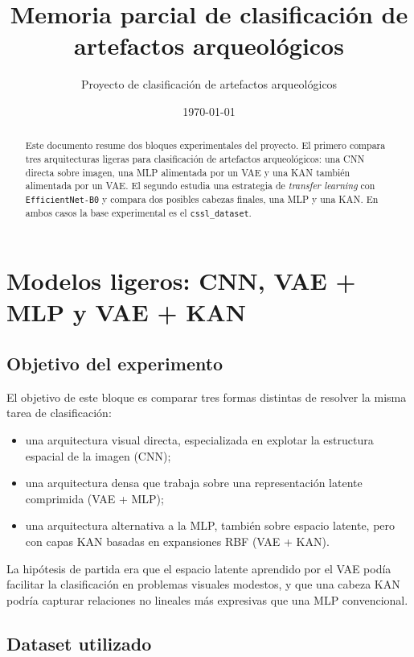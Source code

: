 \documentclass[11pt,a4paper]{report}
\title{Memoria parcial de clasificaci\'on de artefactos arqueol\'ogicos}
\author{Proyecto de clasificaci\'on de artefactos arqueol\'ogicos}
\date{\today}
\begin{document}
\maketitle

\begin{abstract}
Este documento resume dos bloques experimentales del proyecto. El primero compara tres arquitecturas ligeras para clasificaci\'on de artefactos arqueol\'ogicos: una CNN directa sobre imagen, una MLP alimentada por un VAE y una KAN tambi\'en alimentada por un VAE. El segundo estudia una estrategia de \textit{transfer learning} con \texttt{EfficientNet-B0} y compara dos posibles cabezas finales, una MLP y una KAN. En ambos casos la base experimental es el \texttt{cssl\_dataset}.
\end{abstract}

\tableofcontents

\chapter{Modelos ligeros: CNN, VAE + MLP y VAE + KAN}

\section{Objetivo del experimento}

El objetivo de este bloque es comparar tres formas distintas de resolver la misma tarea de clasificaci\'on:

\begin{itemize}
    \item una arquitectura visual directa, especializada en explotar la estructura espacial de la imagen (CNN);
    \item una arquitectura densa que trabaja sobre una representaci\'on latente comprimida (VAE + MLP);
    \item una arquitectura alternativa a la MLP, tambi\'en sobre espacio latente, pero con capas KAN basadas en expansiones RBF (VAE + KAN).
\end{itemize}

La hip\'otesis de partida era que el espacio latente aprendido por el VAE pod\'ia facilitar la clasificaci\'on en problemas visuales modestos, y que una cabeza KAN podr\'ia capturar relaciones no lineales m\'as expresivas que una MLP convencional.

\section{Dataset utilizado}
\end{document}
